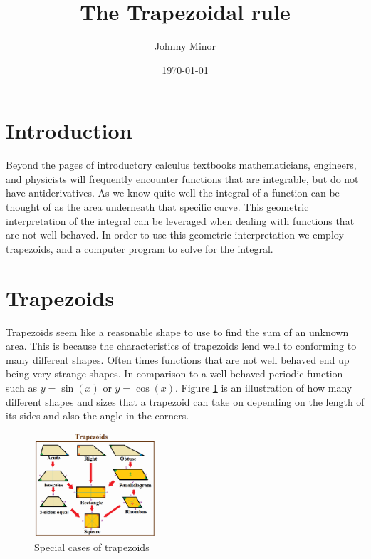 \documentclass[10pt, reqno]{article}
\title{The Trapezoidal rule}
\author{Johnny Minor}
\date{\today}
\numberwithin{equation}{section}
\numberwithin{figure}{section}
\begin{document}
\maketitle

\section{Introduction}
Beyond the pages of introductory calculus textbooks mathematicians, engineers, and physicists will frequently encounter functions that are integrable, but do not have antiderivatives. As we know quite well the integral of a function can be thought of as the area underneath that specific curve. This geometric interpretation of the integral can be leveraged when dealing with functions that are not well behaved. 
In order to use this geometric interpretation we employ trapezoids, and a computer program to solve for the integral. 

\section{Trapezoids}
\label{sec:trapz}

Trapezoids seem like a reasonable shape to use to find the sum of an unknown area. This is because the characteristics of trapezoids lend well to conforming to many different shapes. Often times functions that are not well behaved end up being very strange shapes. In comparison to a well behaved periodic function such as $y = \sin(x) $ or $y = \cos(x)$. Figure \ref{fig:trapz} is an illustration of how many different shapes and sizes that a trapezoid can take on depending on the length of its sides and also the angle in the corners. 


\begin{figure}[H] %
\centering
\includegraphics[width=0.4\textwidth]{Trapezoid_special_cases.png}
\caption{Special cases of trapezoids\cite{ref:trapz}}
\label{fig:trapz}
\end{figure}
\end{document}
